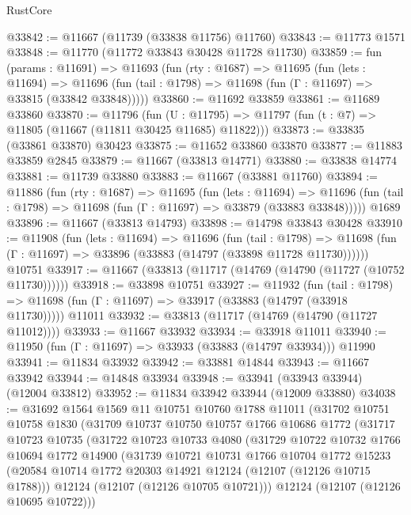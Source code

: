\begin{lexlean}{RustCore}
\begin{coremodule}
@33842 := @11667 (@11739 (@33838 @11756) @11760)
@33843 := @11773 @1571
@33848 := @11770 (@11772 @33843 @30428 @11728 @11730)
@33859 := fun (params : @11691) =>
  @11693
    (fun (rty : @1687) =>
    @11695
      (fun (lets : @11694) =>
      @11696 (fun (tail : @1798) => @11698 (fun (Γ : @11697) => @33815 (@33842 @33848)))))
@33860 := @11692 @33859
@33861 := @11689 @33860
@33870 := @11796
    (fun (U : @11795) => @11797 (fun (t : @7) => @11805 (@11667 (@11811 @30425 @11685) @11822)))
@33873 := @33835 (@33861 @33870) @30423
@33875 := @11652 @33860 @33870
@33877 := @11883 @33859 @2845
@33879 := @11667 (@33813 @14771)
@33880 := @33838 @14774
@33881 := @11739 @33880
@33883 := @11667 (@33881 @11760)
@33894 := @11886
    (fun (rty : @1687) =>
    @11695
      (fun (lets : @11694) =>
      @11696 (fun (tail : @1798) => @11698 (fun (Γ : @11697) => @33879 (@33883 @33848)))))
    @1689
@33896 := @11667 (@33813 @14793)
@33898 := @14798 @33843 @30428
@33910 := @11908
    (fun (lets : @11694) =>
    @11696
      (fun (tail : @1798) =>
      @11698 (fun (Γ : @11697) => @33896 (@33883 (@14797 (@33898 @11728 @11730))))))
    @10751
@33917 := @11667 (@33813 (@11717 (@14769 (@14790 (@11727 (@10752 @11730))))))
@33918 := @33898 @10751
@33927 := @11932
    (fun (tail : @1798) => @11698 (fun (Γ : @11697) => @33917 (@33883 (@14797 (@33918 @11730)))))
    @11011
@33932 := @33813 (@11717 (@14769 (@14790 (@11727 @11012))))
@33933 := @11667 @33932
@33934 := @33918 @11011
@33940 := @11950 (fun (Γ : @11697) => @33933 (@33883 (@14797 @33934))) @11990
@33941 := @11834 @33932
@33942 := @33881 @14844
@33943 := @11667 @33942
@33944 := @14848 @33934
@33948 := @33941 (@33943 @33944) (@12004 @33812)
@33952 := @11834 @33942 @33944 (@12009 @33880)
@34038 := @31692
    @1564
    @1569
    @11
    @10751
    @10760
    @1788
    @11011
    (@31702
      @10751
      @10758
      @1830
      (@31709
        @10737
        @10750
        @10757
        @1766
        @10686
        @1772
        (@31717
          @10723
          @10735
          (@31722
            @10723
            @10733
            @4080
            (@31729
              @10722
              @10732
              @1766
              @10694
              @1772
              @14900
              (@31739
                @10721
                @10731
                @1766
                @10704
                @1772
                @15233
                (@20584 @10714 @1772 @20303 @14921 @12124 (@12107 (@12126 @10715 @1788)))
                @12124
                (@12107 (@12126 @10705 @10721)))
              @12124
              (@12107 (@12126 @10695 @10722)))

\end{coremodule}
\end{lexlean}
